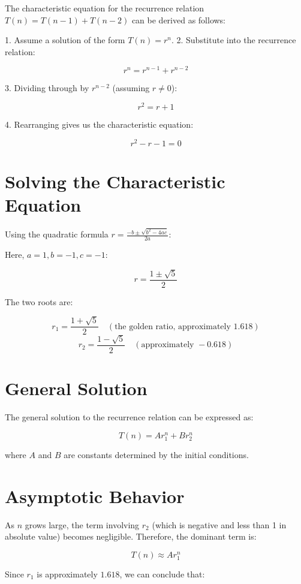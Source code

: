 \documentclass{article}
\begin{document}
	The characteristic equation for the recurrence relation $ T(n) = T(n - 1) + T(n - 2) $ can be derived as follows:
	
	1. Assume a solution of the form $ T(n) = r^n $.
	2. Substitute into the recurrence relation:
	
	$$r^n = r^{n-1} + r^{n-2}$$
	
	3. Dividing through by $ r^{n-2} $ (assuming $ r \neq 0 $):
	
	$$r^2 = r + 1$$
	
	4. Rearranging gives us the characteristic equation:
	
	$$r^2 - r - 1 = 0$$
	
	\section*{Solving the Characteristic Equation}
	
	Using the quadratic formula $ r = \frac{-b \pm \sqrt{b^2 - 4ac}}{2a} $:
	
	Here, $ a = 1, b = -1, c = -1 $:
	
	$$r = \frac{1 \pm \sqrt{5}}{2}$$
	
	The two roots are:
	
	$$r_1 = \frac{1 + \sqrt{5}}{2} \quad (\text{the golden ratio, approximately } 1.618)$$
	$$r_2 = \frac{1 - \sqrt{5}}{2} \quad (\text{approximately } -0.618)$$
	
	\section*{General Solution}
	
	The general solution to the recurrence relation can be expressed as:
	
	$$T(n) = A r_1^n + B r_2^n$$
	
	where $ A $ and $ B $ are constants determined by the initial conditions.
	
	\section*{Asymptotic Behavior}
	
	As $ n $ grows large, the term involving $ r_2 $ (which is negative and less than 1 in absolute value) becomes negligible. Therefore, the dominant term is:
	
	$$T(n) \approx A r_1^n$$
	
	Since $ r_1 $ is approximately $ 1.618 $, we can conclude that:
	
\end{document}
